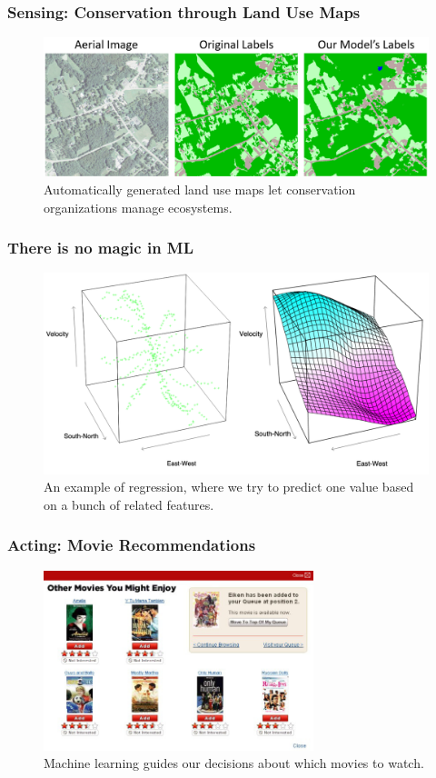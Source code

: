 \documentclass[10pt,mathserif]{beamer}
\begin{document}
\begin{frame}
  \frametitle{Sensing: Conservation through Land Use Maps}
  \begin{figure}[ht]
    \centering
    \includegraphics[width=0.7\paperwidth]{figures/landcover}
    \caption{Automatically generated land use maps let conservation
      organizations manage ecosystems. \label{fig:landcover} }
  \end{figure}
\end{frame}

\begin{frame}
  \frametitle{There is no magic in ML}
  \begin{figure}[ht]
    \centering
    \includegraphics[options]{figures/galaxy}
    \caption{An example of regression, where we try to predict one value based
      on a bunch of related features. \label{fig:astronomy} }
  \end{figure}
\end{frame}

\begin{frame}
  \frametitle{Acting: Movie Recommendations}
  \begin{figure}[ht]
    \centering
    \includegraphics[width=0.7\textwidth]{figures/netflix_abstraction}
    \caption{Machine learning guides our decisions about which movies to watch.}
  \end{figure}
\end{frame}
\end{document}
